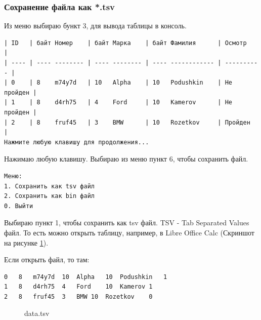 
\subsubsection{Сохранение файла как *.tsv}

Из меню выбираю бункт 3, для вывода таблицы в консоль.

\begin{tcolorbox}
\begin{verbatim}
| ID   | байт Номер    | байт Марка    | байт Фамилия      | Осмотр     |
| ---- | ---- -------- | ---- -------- | ---- ------------ | ---------- |
| 0    | 8    m74y7d   | 10   Alpha    | 10   Podushkin    | Не пройден |
| 1    | 8    d4rh75   | 4    Ford     | 10   Kamerov      | Не пройден |
| 2    | 8    fruf45   | 3    BMW      | 10   Rozetkov     | Пройден    |
Нажмите любую клавишу для продолжения...
\end{verbatim}
\end{tcolorbox}

Нажимаю любую клавишу. Выбираю из меню пункт 6, чтобы сохранить файл.

\begin{tcolorbox}
\begin{verbatim}
Меню:
1. Сохранить как tsv файл
2. Сохранить как bin файл
0. Выйти
\end{verbatim}
\end{tcolorbox}

Выбираю пункт 1, чтобы сохранить как tsv файл. TSV - Tab Separated Values файл. То есть можно открыть таблицу, например, в Libre Office Calc (Скриншот на рисунке \ref{fig:data-tsv}).

Если открыть файл, то там:
\begin{tcolorbox}
\begin{verbatim}
0	8	m74y7d	10	Alpha	10	Podushkin	1
1	8	d4rh75	4	Ford	10	Kamerov	1
2	8	fruf45	3	BMW	10	Rozetkov	0
\end{verbatim}
\end{tcolorbox}

\begin{figure}[h]
    \caption{data.tsv}
    \label{fig:data-tsv}
\end{figure}

